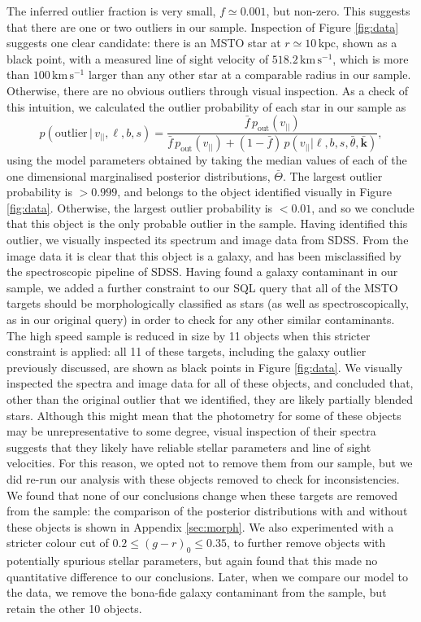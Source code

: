 \documentclass[useAMS,twocolumn,usenatbib]{mn2e}
\def\kpc{{\,\mathrm{kpc}}}
\def\kms{{\,\mathrm{km\,s^{-1}}}}
\def\vlos{{v_{||}}}
\begin{document}
The inferred outlier fraction is very small, $f \simeq 0.001$, but non-zero. 
This suggests that there are one or two outliers in our sample. 
Inspection of Figure \ref{fig:data} suggests one clear candidate: there is an MSTO star at $r\simeq10\kpc$, shown as a black point, with a measured line of sight velocity of $518.2\kms$, which is more than $100\kms$ larger than any other star at a comparable radius in our sample. 
Otherwise, there are no obvious outliers through visual inspection. 
As a check of this intuition, we calculated the outlier probability of each star in our sample as 
%
\begin{equation}
p(\mathrm{outlier}\,|\,\vlos,\ell,b,s) = \dfrac{\bar{f}\,p_\mathrm{out}(\vlos)}{\bar{f}\,p_\mathrm{out}(\vlos) + 
                                                      (1-\bar{f})\,p(\vlos | \ell,b,s,\bar{\theta},\bar{\boldsymbol{k}})},
\end{equation}
%     
using the model parameters obtained by taking the median values of each of the one dimensional marginalised posterior distributions, $\bar{\Theta}$.  
The largest outlier probability is $>0.999$, and belongs to the object identified visually in Figure \ref{fig:data}. 
Otherwise, the largest outlier probability is $<0.01$, and so we conclude that this object is the only probable outlier in the sample. 
Having identified this outlier, we visually inspected its spectrum and image data from SDSS.
From the image data it is clear that this object is a galaxy, and has been misclassified by the spectroscopic pipeline of SDSS.
Having found a galaxy contaminant in our sample, we added a further constraint to our {\sc SQL} query that all of the MSTO targets should be morphologically classified as stars (as well as spectroscopically, as in our original query) in order to check for any other similar contaminants.
The high speed sample is reduced in size by 11 objects when this stricter constraint is applied: all 11 of these targets, including the galaxy outlier previously discussed, are shown as black points in Figure \ref{fig:data}.
We visually inspected the spectra and image data for all of these objects, and concluded that, other than the original outlier that we identified, they are likely partially blended stars.
Although this might mean that the photometry for some of these objects may be unrepresentative to some degree, visual inspection of their spectra suggests that they likely have reliable stellar parameters and line of sight velocities.
For this reason, we opted not to remove them from our sample, but we did re-run our analysis with these objects removed to check for inconsistencies.
We found that none of our conclusions change when these targets are removed from the sample: the comparison of the posterior distributions with and without these objects is shown in Appendix \ref{sec:morph}.
We also experimented with a stricter colour cut of $0.2 \leq (g-r)_0 \leq 0.35$, to further remove objects with potentially spurious stellar parameters, but again found that this made no quantitative difference to our conclusions. 
Later, when we compare our model to the data, we remove the bona-fide galaxy contaminant from the sample, but retain the other 10 objects.
\end{document}
